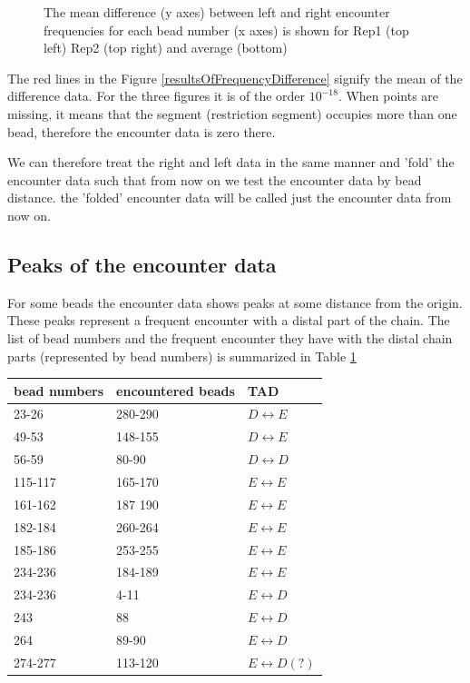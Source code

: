 \documentclass[12pt]{paper}
\begin{document}
\begin{figure}[H]
\caption{\scriptsize{ The mean difference (y axes) between left and right encounter frequencies for each bead number (x axes) is shown for Rep1 (top left) Rep2 (top right) and average (bottom)}}
\end{figure}  
The red lines in the Figure \ref{resultsOfFrequencyDifference} signify the mean of the difference data. For the three figures it is of the order $10^{-18}$. When points are missing, it means that the segment (restriction segment) occupies more than one bead, therefore the encounter data is zero there. 

We can therefore treat the right and left data in the same manner and 'fold' the encounter data such that from now on we test the encounter data by bead distance. the 'folded' encounter data will be called just the encounter data from now on. 

\subsection{Peaks of the encounter data}
For some beads the encounter data shows peaks at some distance from the origin. 
These peaks represent a frequent encounter with a distal part of the chain. The list of bead numbers and the frequent encounter they have with the distal chain parts (represented by bead numbers) is summarized in Table \ref{nonNeighborBeadEncounterTable}
\begin{table}[H]\label{nonNeighborBeadEncounterTable}
\begin{tabular}{l l l}
bead numbers & encountered beads & TAD\\
\hline

23-26   & 280-290 & $D\leftrightarrow E$\\
49-53   & 148-155 & $D\leftrightarrow E$\\
56-59   & 80-90   & $D\leftrightarrow D$\\
115-117 & 165-170 & $E\leftrightarrow E$\\
161-162 & 187 190 & $E\leftrightarrow E$\\
182-184 & 260-264 & $E\leftrightarrow E$\\
185-186 & 253-255 & $E\leftrightarrow E$\\
234-236 & 184-189 & $E\leftrightarrow E$\\
234-236 & 4-11    & $E\leftrightarrow D$\\
243     & 88      & $E\leftrightarrow D$\\
264     & 89-90   & $E\leftrightarrow D$\\
274-277 & 113-120 & $E\leftrightarrow D(?)$
\end{tabular}
\end{table}
\end{document}
